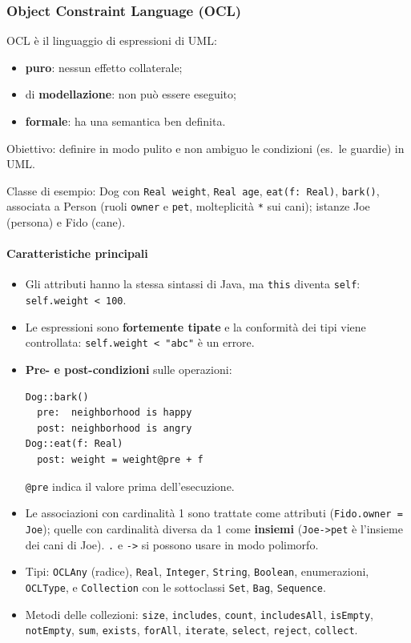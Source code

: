 \documentclass[a4paper,12pt]{article}
\begin{document}
\subsubsection{Object Constraint Language (OCL)}
OCL è il linguaggio di espressioni di UML:
\begin{itemize}
  \item \textbf{puro}: nessun effetto collaterale;
  \item di \textbf{modellazione}: non può essere eseguito;
  \item \textbf{formale}: ha una semantica ben definita.
\end{itemize}
Obiettivo: definire in modo pulito e non ambiguo le condizioni (es.\ le guardie) in UML.

Classe di esempio: \textsf{Dog} con \texttt{Real weight}, \texttt{Real age},
\texttt{eat(f: Real)}, \texttt{bark()}, associata a \textsf{Person} (ruoli
\texttt{owner} e \texttt{pet}, molteplicità \texttt{*} sui cani); istanze \textsf{Joe}
(persona) e \textsf{Fido} (cane).

\paragraph{Caratteristiche principali}
\begin{itemize}
  \item Gli attributi hanno la stessa sintassi di Java, ma \texttt{this} diventa
        \texttt{self}: \texttt{self.weight < 100}.
  \item Le espressioni sono \textbf{fortemente tipate} e la conformità dei tipi viene
        controllata: \texttt{self.weight < "abc"} è un errore.
  \item \textbf{Pre- e post-condizioni} sulle operazioni:
\begin{verbatim}
Dog::bark()
  pre:  neighborhood is happy
  post: neighborhood is angry
Dog::eat(f: Real)
  post: weight = weight@pre + f
\end{verbatim}
        \texttt{@pre} indica il valore prima dell'esecuzione.
  \item Le associazioni con cardinalità 1 sono trattate come attributi
        (\texttt{Fido.owner = Joe}); quelle con cardinalità diversa da 1 come
        \textbf{insiemi} (\texttt{Joe->pet} è l'insieme dei cani di Joe). \texttt{.} e
        \texttt{->} si possono usare in modo polimorfo.
  \item Tipi: \texttt{OCLAny} (radice), \texttt{Real}, \texttt{Integer},
        \texttt{String}, \texttt{Boolean}, enumerazioni, \texttt{OCLType}, e
        \texttt{Collection} con le sottoclassi \texttt{Set}, \texttt{Bag},
        \texttt{Sequence}.
  \item Metodi delle collezioni: \texttt{size}, \texttt{includes}, \texttt{count},
        \texttt{includesAll}, \texttt{isEmpty}, \texttt{notEmpty}, \texttt{sum},
        \texttt{exists}, \texttt{forAll}, \texttt{iterate}, \texttt{select},
        \texttt{reject}, \texttt{collect}.
\end{itemize}
\end{document}

